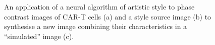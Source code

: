 \begin{figure}[h!]%
    \centering
    \qquad
    \qquad
    \qquad
    \qquad
    \qquad
    \caption{An application of a neural algorithm of artistic style to phase contrast images of CAR-T cells (a) and a style source image (b) to synthesise a new image combining their characteristics in a ``simulated'' image (c).}%
    \label{fig:dying_cell_frames}
\end{figure}

